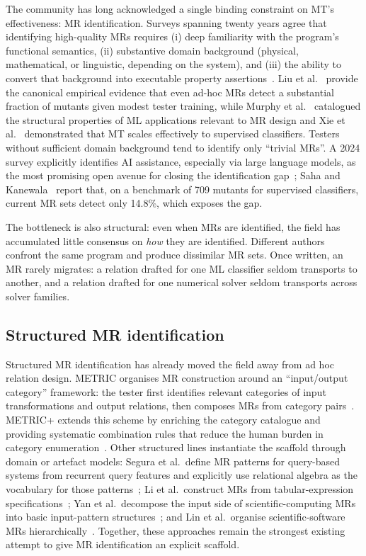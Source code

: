 \documentclass[manuscript]{acmart}
\begin{document}
The community has long acknowledged a single binding constraint on MT's effectiveness: MR identification. Surveys spanning twenty years agree that identifying high-quality MRs requires (i) deep familiarity with the program's functional semantics, (ii) substantive domain background (physical, mathematical, or linguistic, depending on the system), and (iii) the ability to convert that background into executable property assertions~\cite{Segura2016, LiTOSEM2025}. Liu et al.~\cite{Liu2014MTEffectiveness} provide the canonical empirical evidence that even ad-hoc MRs detect a substantial fraction of mutants given modest tester training, while Murphy et al.~\cite{Murphy2008} catalogued the structural properties of ML applications relevant to MR design and Xie et al.~\cite{Xie2011} demonstrated that MT scales effectively to supervised classifiers. Testers without sufficient domain background tend to identify only ``trivial MRs''. A 2024 survey explicitly identifies AI assistance, especially via large language models, as the most promising open avenue for closing the identification gap~\cite{LiTOSEM2025}; Saha and Kanewala~\cite{Saha2019SupervisedMR} report that, on a benchmark of 709 mutants for supervised classifiers, current MR sets detect only 14.8\%, which exposes the gap.

The bottleneck is also structural: even when MRs are identified, the field has accumulated little consensus on \emph{how} they are identified. Different authors confront the same program and produce dissimilar MR sets. Once written, an MR rarely migrates: a relation drafted for one ML classifier seldom transports to another, and a relation drafted for one numerical solver seldom transports across solver families.

\subsection{Structured MR identification}

Structured MR identification has already moved the field away from ad hoc relation design. METRIC organises MR construction around an ``input/output category'' framework: the tester first identifies relevant categories of input transformations and output relations, then composes MRs from category pairs~\cite{ChenMETRIC2016}. METRIC+ extends this scheme by enriching the category catalogue and providing systematic combination rules that reduce the human burden in category enumeration~\cite{SunMETRICplus2021}. Other structured lines instantiate the scaffold through domain or artefact models: Segura et al.\ define MR patterns for query-based systems from recurrent query features and explicitly use relational algebra as the vocabulary for those patterns~\cite{Segura2019QBSMRPatterns}; Li et al.\ construct MRs from tabular-expression specifications~\cite{Li2020TabularMR}; Yan et al.\ decompose the input side of scientific-computing MRs into basic input-pattern structures~\cite{Yan2022InputPattern}; and Lin et al.\ organise scientific-software MRs hierarchically~\cite{Lin2018HierarchicalMR}. Together, these approaches remain the strongest existing attempt to give MR identification an explicit scaffold.
\end{document}

